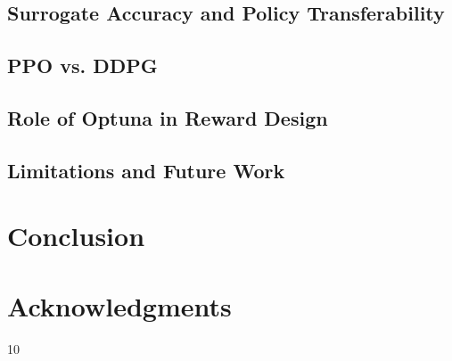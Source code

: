\documentclass[journal,10pt,twocolumn]{IEEEtran}
\begin{document}

\subsection{Surrogate Accuracy and Policy Transferability}


\subsection{PPO vs. DDPG}


\subsection{Role of Optuna in Reward Design}


\subsection{Limitations and Future Work}


\section{Conclusion}
\label{sec:conclusion}


\section*{Acknowledgments}


\begin{thebibliography}{10}


\end{thebibliography}
\end{document}
